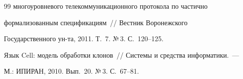 {{\begin{thebibliography}{99}
многоуровневого телекоммуникационного протокола по частично 


формализованным спецификациям~/\!\!/ Вестник Воронежского 


Государственного ун-та, 2011. Т.~7. №\,3. С.~120--125.





 \label{end\stat}


 






Язык Cell: модель обработки клонов~/\!\!/ Системы и средства информатики.~--- 


М.: ИПИРАН, 2010.   Вып.~20. №\,3. С.~67--81.








 \end{thebibliography}


}


}





     





















        






      


